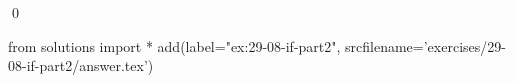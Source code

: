 
\begin{ex}
  \label{ex:29-08-if-part2}
  
  \qed
\end{ex}
\begin{python0}
from solutions import *
add(label="ex:29-08-if-part2",
    srcfilename='exercises/29-08-if-part2/answer.tex')
\end{python0}

